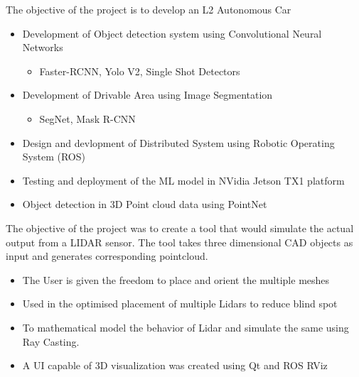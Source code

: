 \documentclass[10pt,a4paper,ragged2e,withhyper]{altacv}
\begin{document}
            The objective of the project is to develop an L2 Autonomous Car
            \linebreak
            \begin{itemize}
                \item Development of Object detection system using Convolutional Neural Networks
                    \begin{itemize}
                        \item Faster-RCNN, Yolo V2, Single Shot Detectors
                    \end{itemize}
                \item Development of Drivable Area using Image Segmentation
                    \begin{itemize}
                        \item SegNet, Mask R-CNN
                    \end{itemize}
                \item Design and devlopment of Distributed System using Robotic Operating System (ROS)
                \item Testing and deployment of the ML model in NVidia Jetson TX1 platform
                \item Object detection in 3D Point cloud data using PointNet
            \end{itemize}
            \divider

            The objective of the project was to create a tool that would simulate the actual output from a LIDAR sensor. The tool takes three dimensional CAD objects as input and generates corresponding pointcloud.
            \linebreak
            \begin{itemize}
                \item The User is given the freedom to place and orient the multiple meshes
                \item Used in the optimised placement of multiple Lidars to reduce blind spot
                \item To mathematical model the behavior of Lidar and simulate the same using Ray Casting.
                \item A UI capable of 3D visualization was created using Qt and ROS RViz
            \end{itemize}
            \divider
\end{document}
